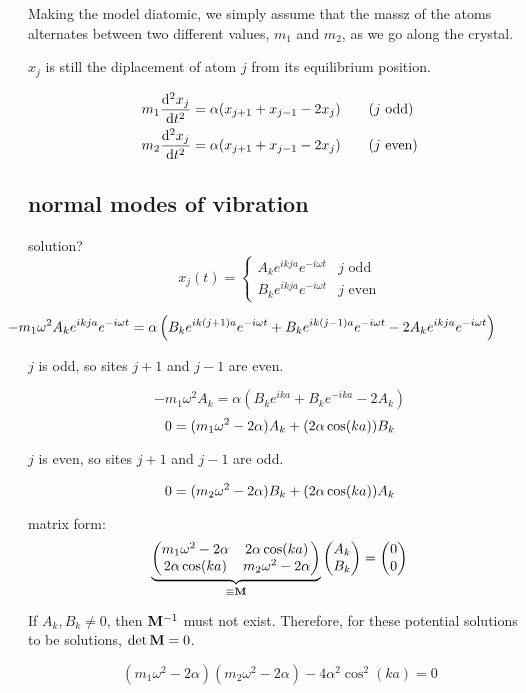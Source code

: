 \documentclass[10pt, a4paper, twocolumn]{article}
\begin{document}
Making the model diatomic, we simply assume that the massz of the atoms alternates between two different values, $m_1$ and $m_2$, as we go along the crystal.

$x_j$ is still the diplacement of atom $j$ from its equilibrium position.

\begin{equation*}
\begin{aligned} 
m_1\dv[2]{x_j}{t}&=\alpha(x_{j+1}+x_{j-1}-2x_j)
\qquad (j\text{ odd})
\\ m_2\dv[2]{x_j}{t}&=\alpha(x_{j+1}+x_{j-1}-2x_j)
\qquad (j\text{ even})
\end{aligned} 
\end{equation*}

\subsection{normal modes of vibration}
solution?
\[x_j(t)=\begin{cases}
A_ke^{ikja}e^{-i\omega t} & j\text{ odd}
\\ B_ke^{ikja}e^{-i\omega t} & j\text{ even}
\end{cases}\]

\[\hspace{-4em}
-m_1\omega ^2A_ke^{ikja}e^{-i\omega t}
=\alpha \left(
B_ke^{ik(j+1)a}e^{-i\omega t}
+B_ke^{ik(j-1)a}e^{-i\omega t}
-2A_ke^{ikja}e^{-i\omega t}
\right) \]

$j$ is odd, so sites $j+1$ and $j-1$ are even.

\[ -m_1\omega ^2A_k
=\alpha \left(
B_ke^{ika} +B_ke^{-ika} -2A_k
\right) \]
\[0=(m_1\omega ^2-2\alpha )A_k
+\pqty{2\alpha \cos(ka)}B_k\]

$j$ is even, so sites $j+1$ and $j-1$ are odd.

\[0=(m_2\omega ^2-2\alpha )B_k
+\pqty{2\alpha \cos(ka)}A_k\]

matrix form:
\[ \underbrace{\begin{pmatrix}
m_1\omega ^2-2\alpha & 2\alpha \cos(ka)
\\2\alpha \cos (ka) & m_2\omega ^2-2\alpha \end{pmatrix}
}_{\equiv \vb{M}}
\pmqty{A_k\\ B_k} = \pmqty{0\\0}\]

If $A_k,B_k\neq 0$, then $\vb M^{-1}$ must not exist. Therefore, for these potential solutions to be solutions, $\det \vb M = 0$.

\[(m_1\omega ^2-2\alpha )
(m_2\omega ^2-2\alpha)
-4\alpha ^2\cos ^2(ka)=0\]
\end{document}
